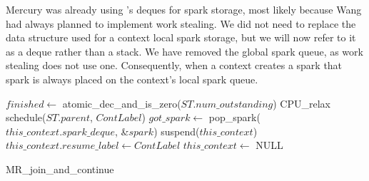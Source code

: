 
Mercury was already using \citet{Chase_2005_wsdeque}'s deques for spark
storage,
most likely because Wang had always planned to implement work stealing.
We did not need to replace the data structure used for a context local
spark storage,
but we will now refer to it as a deque rather than a stack.
We have removed the global spark queue,
as work stealing does not use one.
Consequently,
when a context creates a spark that spark is always placed on the
context's local spark queue.

\begin{algorithm}
\begin{algorithmic}[1]
  \State $finished \gets$ atomic\_dec\_and\_is\_zero($ST.num\_outstanding$)
    \Else
        \State CPU\_relax
      \EndWhile
      \State schedule($ST.parent$, $ContLabel$)
    \EndIf
  \Else
    \State $got\_spark \gets$ pop\_spark($this\_context.spark\_deque$,
        \&$spark$)
    \Else
         \State suspend($this\_context$)
         \State $this\_context.resume\_label \gets ContLabel$
         \State $this\_context \gets$ NULL
      \EndIf
    \EndIf
  \EndIf
\EndProcedure
\end{algorithmic}
\caption{MR\_join\_and\_continue}
\label{alg:join_and_continue_ws1}
\end{algorithm}

